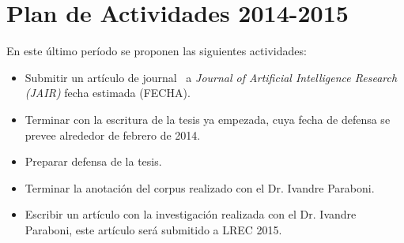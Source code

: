 \section{Plan de Actividades 2014-2015}
\label{plandetrabajo}

En este \'ultimo per\'iodo se proponen las siguientes actividades:

\begin{itemize}

\item Submitir un art\'iculo de journal~\cite{benotti-altamirano-jair} a \emph{Journal of Artificial Intelligence Research (JAIR)} fecha estimada (FECHA).
\item Terminar con la escritura de la tesis ya empezada, cuya fecha de defensa se prevee alrededor de febrero de 2014.
\item Preparar defensa de la tesis.
\item Terminar la anotaci\'on del corpus realizado con el Dr. Ivandre Paraboni.
\item Escribir un art\'iculo con la investigaci\'on realizada con el Dr. Ivandre Paraboni, este art\'iculo ser\'a submitido a LREC 2015.

\end{itemize}

